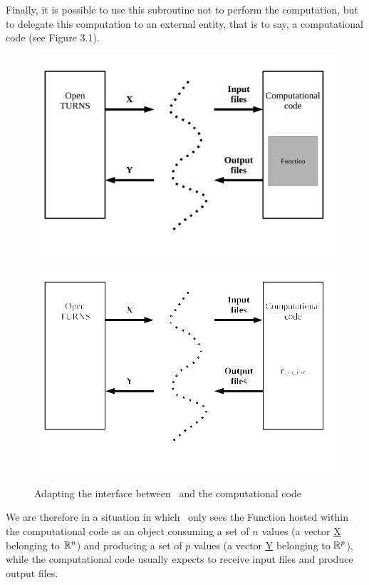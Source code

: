 Finally, it is possible to use this subroutine not to perform the computation, but to delegate this computation to an external entity, that is to say, a computational code (see Figure 3.1).

\begin{figure}
  \begin{center}
    \ifpdf
    \includegraphics[width=12cm]{Figure1.pdf}
    \else
    \includegraphics[width=12cm]{Figure1.png}
    \fi
    \caption[Figure 1]{Adapting the interface between \OT\ and the computational code}
  \end{center}
\end{figure}

We are therefore in a situation in which \OT\ only sees the Function hosted within the computational code as an object consuming a set of $n$ values (a vector \underline{X} belonging to $\mathbb{R}^{n}$) and producing a set of $p$ values (a vector \underline{Y} belonging to $\mathbb{R}^{p}$), while the computational code usually expects to receive input files and produce output files.

